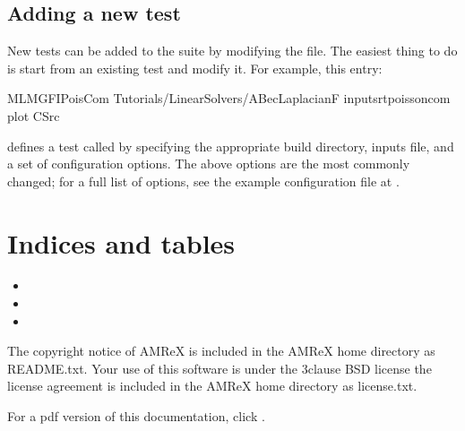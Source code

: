 \documentclass[letterpaper,10pt,english]{sphinxmanual}
\begin{document}
\section{Adding a new test}
\label{\detokenize{Testing:adding-a-new-test}}
\sphinxAtStartPar
New tests can be added to the suite by modifying the  file. The easiest thing to
do is start from an existing test and modify it. For example, this entry:

\begin{sphinxVerbatim}[commandchars=\\\{\}]
\PYG{o}{[}MLMG\PYGZus{}FI\PYGZus{}PoisCom\PYG{o}{]}
  Tutorials/LinearSolvers/ABecLaplacian\PYGZus{}F
  inputs\PYGZhy{}rt\PYGZhy{}poisson\PYGZhy{}com
  
  
  
  
  
  
  
  
  plot
  C\PYGZus{}Src
\end{sphinxVerbatim}

\sphinxAtStartPar
defines a test called  by specifying the appropriate build directory, inputs file,
and a set of configuration options. The above options are the most commonly changed; for a full list
of options, see the example configuration file at .


\chapter{Indices and tables}
\label{\detokenize{index:indices-and-tables}}\begin{itemize}
\item {} 
\sphinxAtStartPar
{}

\item {} 
\sphinxAtStartPar
{}

\item {} 
\sphinxAtStartPar
{}

\end{itemize}

\sphinxAtStartPar
The copyright notice of AMReX is included in the AMReX home directory
as README.txt.
Your use of this software is under the 3\sphinxhyphen{}clause BSD license \textendash{} the license agreement is included in the
AMReX home directory as license.txt.

\sphinxAtStartPar
For a pdf version of this documentation, click .



\renewcommand{\indexname}{Index}
\printindex
\end{document}
